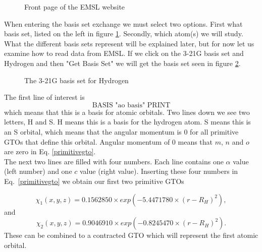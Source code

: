 \documentclass[a4paper,norsk,11pt,twoside]{report}
\begin{document}
\begin{figure}[h!]
\begin{center}
\caption{Front page of the EMSL website}
\label{fig:EMSL}
\end{center}
\end{figure}

When entering the basis set exchange we must select two options. First
what basis set, listed on the left in figure \ref{fig:EMSL}. Secondly,
which atom(s) we will study. What the different basis sets represent will
be explained later, but for now let us examine how to read data from
EMSL. If we click on the 3-21G basis set and Hydrogen and then "Get Basis
Set" we will get the basis set seen in figure \ref{fig:3-21G_H}. \\

\begin{figure}[h!]
\begin{center}
\caption{The 3-21G basis set for Hydrogen}
\label{fig:3-21G_H}
\end{center}
\end{figure}

The first line of interest is\\

\begin{equation}
\text{BASIS "ao basis" PRINT} \nonumber
\end{equation}
which means that this is a basis for atomic orbitals. Two lines down
we see two letters, H and S. H means this is a basis for the hydrogen
atom. S means this is an S orbital, which means that the angular
momentum is 0 for all primitive GTOs that define this orbital. Angular
momentum of 0 means that $m$, $n$ and $o$ are zero in
Eq. \eqref{primitivegto}. \\

The next two lines are filled with four numbers. Each line contains
one $\alpha$ value (left number) and one $c$ value (right
value). Inserting these four numbers in Eq.~\eqref{primitivegto} we
obtain our first two primitive GTOs

\begin{equation}
\chi_1(x,y,z) = 0.1562850 \times exp(-5.4471780 \times (r-R_H)^2) ,
\end{equation}
and
\begin{equation}
\chi_2(x,y,z) = 0.9046910 \times exp(-0.8245470 \times (r-R_H)^2) .
\end{equation}
These can be combined to a contracted GTO which will represent the first atomic orbital.
\end{document}
